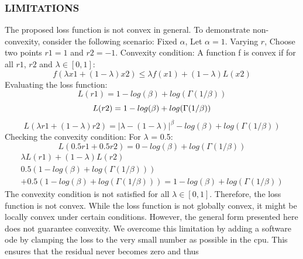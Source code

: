 \documentclass[letterpaper, 10 pt, conference]{ieeeconf}  %
\begin{document}
\subsubsection*{LIMITATIONS}

The proposed loss function is not convex in general. 
To demonstrate non-convexity, consider the following scenario:
Fixed $\alpha$, Let $\alpha = 1$.
Varying $r$, Choose two points $r1 = 1$ and $r2 = -1$.
Convexity condition: A function f is convex if for all $r1$, $r2$ and $\lambda \in [0, 1]$:
\begin{equation*}
    f(\lambda x1 + (1-\lambda) x2) \leq \lambda f(x1) + (1-\lambda)L(x2)
\end{equation*}
Evaluating the loss function:
\begin{equation*}
L(r1) = 1 - log(\beta) + log(\Gamma(1/\beta))
\end{equation*}
\begin{equation*}
L(r2) = 1 - log(\beta) + log(\Gamma(1/\beta)) \\
\end{equation*}
\begin{equation*}
L(\lambda r1 + (1-\lambda)r2) = | \lambda - (1-\lambda)|^\beta - log(\beta) + log(\Gamma(1/\beta))
\end{equation*}
Checking the convexity condition:
For $\lambda$ = 0.5:
\begin{equation*}
   L(0.5r1 + 0.5r2) = 0 - log(\beta) + log(\Gamma(1/\beta)) 
\end{equation*}
\begin{multline*}
\lambda L(r1) + (1-\lambda)L(r2) \\ 
0.5(1 - log(\beta) + log(\Gamma(1/\beta))) \\ + 0.5(1 - log(\beta) + log(\Gamma(1/\beta))) = 1 - log(\beta) + log(\Gamma(1/\beta))
\end{multline*}
The convexity condition is not satisfied for all $\lambda \in [0, 1]$. Therefore, the loss function is not convex.
While the loss function is not globally convex, it might be locally convex under certain conditions. However, the general form presented here does not guarantee convexity. 
We overcome this limitation by adding a software ode by clamping the loss to the very small number as possible in the cpu. This ensures that the residual never becomes zero and thus 
\end{document}
